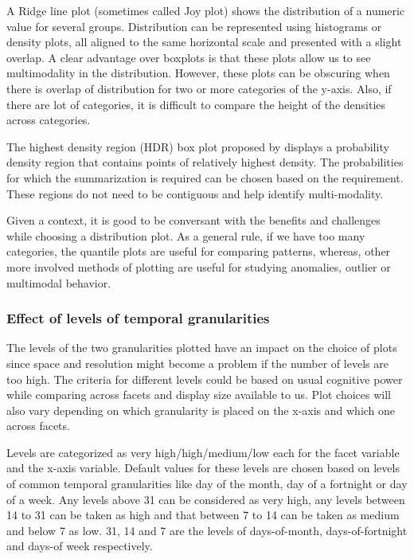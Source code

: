 \documentclass[12pt]{article}
\begin{document}
A Ridge line plot (sometimes called Joy plot) shows the distribution of
a numeric value for several groups. Distribution can be represented
using histograms or density plots, all aligned to the same horizontal
scale and presented with a slight overlap. A clear advantage over
boxplots is that these plots allow us to see multimodality in the
distribution. However, these plots can be obscuring when there is
overlap of distribution for two or more categories of the y-axis. Also,
if there are lot of categories, it is difficult to compare the height of
the densities across categories.

The highest density region (HDR) box plot proposed by
\citep{Hyndman1996-ft} displays a probability density region that
contains points of relatively highest density. The probabilities for
which the summarization is required can be chosen based on the
requirement. These regions do not need to be contiguous and help
identify multi-modality.

Given a context, it is good to be conversant with the benefits and
challenges while choosing a distribution plot. As a general rule, if we
have too many categories, the quantile plots are useful for comparing
patterns, whereas, other more involved methods of plotting are useful
for studying anomalies, outlier or multimodal behavior.

\hypertarget{effect-of-levels-of-temporal-granularities}{%
\subsubsection{Effect of levels of temporal
granularities}\label{effect-of-levels-of-temporal-granularities}}

The levels of the two granularities plotted have an impact on the choice
of plots since space and resolution might become a problem if the number
of levels are too high. The criteria for different levels could be based
on usual cognitive power while comparing across facets and display size
available to us. Plot choices will also vary depending on which
granularity is placed on the x-axis and which one across facets.

Levels are categorized as very high/high/medium/low each for the facet
variable and the x-axis variable. Default values for these levels are
chosen based on levels of common temporal granularities like day of the
month, day of a fortnight or day of a week. Any levels above 31 can be
considered as very high, any levels between 14 to 31 can be taken as
high and that between 7 to 14 can be taken as medium and below 7 as low.
31, 14 and 7 are the levels of days-of-month, days-of-fortnight and
days-of week respectively.
\end{document}
